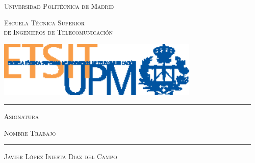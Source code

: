\begin{center}

    {\scshape \Large{Universidad Politécnica de Madrid} \par}
    \vspace{0.7cm}
    {\scshape \large{Escuela Técnica Superior \\de Ingenieros de Telecomunicación} \par}
    \vspace{2.5cm}
    
    \includegraphics[width=0.75\textwidth]{logos/etsit_logo.eps}
    
    \vspace{4.2cm}
    
    \rule{17cm}{0.2mm}

    {\scshape\Huge Asignatura \par}
    \vspace{1cm}
	{\scshape\Huge Nombre Trabajo \par}
	
   	\rule{17cm}{0.6mm}

    \vspace{6cm}
    {\scshape \Large Javier López Iniesta Díaz del Campo \par}
    \vspace{1.5cm}
    
\end{center}
